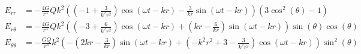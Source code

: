 \documentclass{article}
\begin{document}

\addtocounter{equation}{6}
\begin{align}
    E_{rr} &= - \frac{4 G}{r^{3}} Q k^{2} \left(\left(-1 + \frac{3}{k^{2} r^{2}}\right) \cos{\left (\omega t - k r \right )} - \frac{3}{k r} \sin{\left (\omega t - k r \right )}\right) \left(3 \cos^{2}{\left (\theta \right )} - 1\right) \\
    E_{r\theta} &= - \frac{4 G}{r^{3}} Q k^{2} \left(\left(-3 + \frac{6}{k^{2} r^{2}}\right) \cos{\left (\omega t - k r \right )} + \left(k r - \frac{6}{k r}\right) \sin{\left (\omega t - k r \right )}\right) \sin{\left (\theta \right )} \cos{\left (\theta \right )} \\
    E_{\theta\theta} &= - \frac{G Q}{r^{3}} k^{2} \left(- \left(2 k r - \frac{3}{k r}\right) \sin{\left (\omega t - k r \right )} + \left(- k^{2} r^{2} + 3 - \frac{3}{k^{2} r^{2}}\right) \cos{\left (\omega t - k r \right )}\right) \sin^{2}{\left (\theta \right )}
\end{align}
\end{document}
